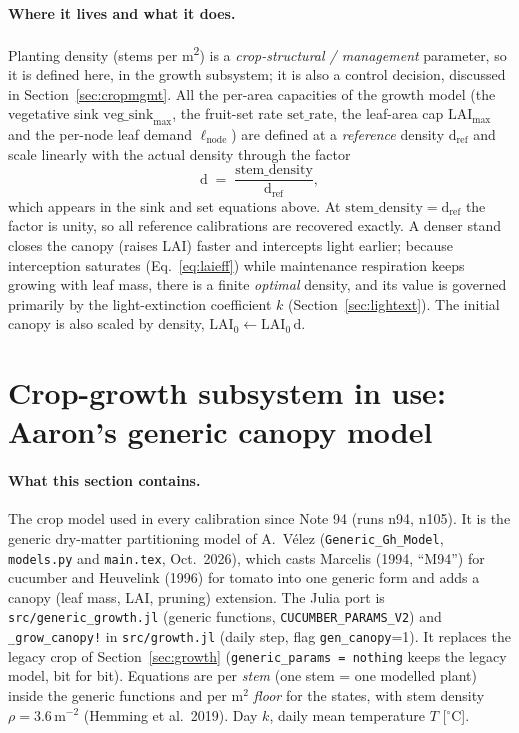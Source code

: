 \documentclass[11pt,a4paper]{article}
\begin{document}
\paragraph{Where it lives and what it does.} Planting density (stems per \si{m^2}) is a
\emph{crop-structural / management} parameter, so it is defined here, in the growth subsystem; it is
also a control decision, discussed in Section~\ref{sec:cropmgmt}. All the per-area capacities of the
growth model (the vegetative sink $\mathrm{veg\_sink}_{\max}$, the fruit-set rate $\mathrm{set\_rate}$,
the leaf-area cap $\mathrm{LAI}_{\max}$ and the per-node leaf demand $\ell_{\text{node}}$) are defined
at a \emph{reference} density $\mathrm{d}_{\text{ref}}$ and scale linearly with the actual density
through the factor
\begin{equation}
  \mathrm{d} \;=\; \frac{\mathrm{stem\_density}}{\mathrm{d}_{\text{ref}}},
\end{equation}
which appears in the sink and set equations above. At $\mathrm{stem\_density}=\mathrm{d}_{\text{ref}}$
the factor is unity, so all reference calibrations are recovered exactly. A denser stand closes the
canopy (raises LAI) faster and intercepts light earlier; because interception saturates
(Eq.~\eqref{eq:laieff}) while maintenance respiration keeps growing with leaf mass, there is a
finite \emph{optimal} density, and its value is governed primarily by the light-extinction
coefficient $k$ (Section~\ref{sec:lightext}). The initial canopy is also scaled by density,
$\mathrm{LAI}_0\!\leftarrow\!\mathrm{LAI}_0\,\mathrm{d}$.


\section{Crop-growth subsystem in use: Aaron's generic canopy model}\label{sec:aaron}

\paragraph{What this section contains.} The crop model used in every calibration since Note 94 (runs n94,
n105). It is the generic dry-matter partitioning model of A.~V\'elez (\texttt{Generic\_Gh\_Model}, \texttt{models.py}
and \texttt{main.tex}, Oct.~2026), which casts Marcelis (1994, ``M94'') for cucumber and Heuvelink (1996) for tomato
into one generic form and adds a canopy (leaf mass, LAI, pruning) extension. The Julia port is
\texttt{src/generic\_growth.jl} (generic functions, \texttt{CUCUMBER\_PARAMS\_V2}) and \texttt{\_grow\_canopy!} in
\texttt{src/growth.jl} (daily step, flag \texttt{gen\_canopy}=1). It replaces the legacy crop of
Section~\ref{sec:growth} (\texttt{generic\_params = nothing} keeps the legacy model, bit for bit).
Equations are per \emph{stem} (one stem = one modelled plant) inside the generic functions and per
m$^2$ \emph{floor} for the states, with stem density $\rho=3.6$\,m$^{-2}$ (Hemming et al.\ 2019).
Day $k$, daily mean temperature $T$ [$^\circ$C].
\end{document}

